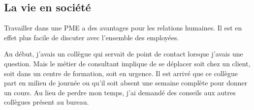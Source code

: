 \subsection{La vie en société}
Travailler dans une PME a des avantages pour les relations humaines.
Il est en effet plus facile de discuter avec l'ensemble des employées.

Au début, j'avais un collègue qui servait de point de contact lorsque j'avais une question.
Mais le métier de consultant implique de se déplacer soit chez un client, soit dans un centre de formation, soit en urgence.
Il est arrivé que ce collègue part en milieu de journée ou qu'il soit absent une semaine complète pour donner un cours.
Au lieu de perdre mon temps, j'ai demandé des conseils aux autres collègues présent au bureau. 

